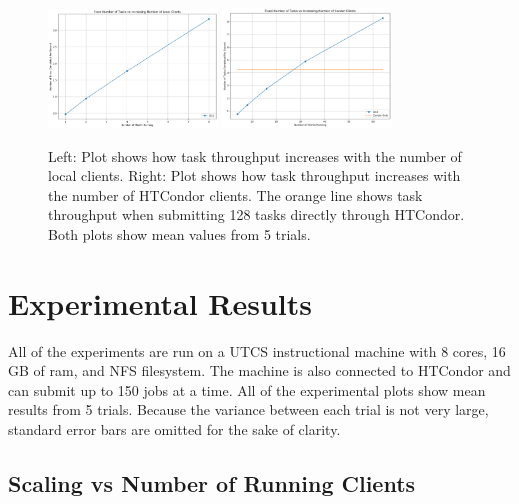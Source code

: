 \documentclass{article}
\begin{document}
\begin{figure}[t]
  \begin{center}
    \includegraphics[width=0.4\textwidth]{client_scaling_local.png}
    \includegraphics[width=0.4\textwidth]{client_scaling_condor.png}
    \caption{Left: Plot shows how task throughput increases with the number of local clients. Right: Plot shows how task throughput increases with the number of HTCondor clients. The orange line shows task throughput when submitting 128 tasks directly through HTCondor. Both plots show mean values from 5 trials.}
    \label{fg:client_scaling}
  \end{center}
\end{figure}

\section{Experimental Results}

All of the experiments are run on a UTCS instructional machine with 8 cores, 16 GB of ram, and NFS filesystem. The machine is also connected to HTCondor and can submit up to 150 jobs at a time. All of the experimental plots show mean results from 5 trials. Because the variance between each trial is not very large, standard error bars are omitted for the sake of clarity.

\subsection{Scaling vs Number of Running Clients}
\end{document}
